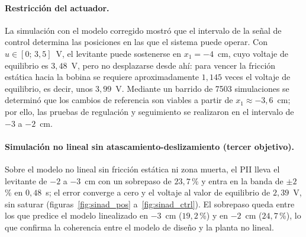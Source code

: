 \paragraph{Restricción del actuador.}
La simulación con el modelo corregido mostró que el intervalo de la señal de control determina las posiciones en las que el sistema puede operar. Con $u\in[0;\,3{,}5]$~V, el levitante puede sostenerse en $x_1=-4$~cm, cuyo voltaje de equilibrio es $3{,}48$~V, pero no desplazarse desde ahí: para vencer la fricción estática hacia la bobina se requiere aproximadamente $1{,}145$ veces el voltaje de equilibrio, es decir, unos $3{,}99$~V. Mediante un barrido de 7503 simulaciones se determinó que los cambios de referencia son viables a partir de $x_1\approx-3{,}6$~cm; por ello, las pruebas de regulación y seguimiento se realizaron en el intervalo de $-3$ a $-2$~cm.

\paragraph{Simulación no lineal sin atascamiento-deslizamiento (tercer objetivo).}
Sobre el modelo no lineal sin fricción estática ni zona muerta, el PII lleva el levitante de $-2$ a $-3$~cm con un sobrepaso de $23{,}7$\,\% y entra en la banda de $\pm2$\,\% en $0{,}48$~s; el error converge a cero y el voltaje al valor de equilibrio de $2{,}39$~V, sin saturar (figuras~\ref{fig:sinad_pos} a~\ref{fig:sinad_ctrl}). El sobrepaso queda entre los que predice el modelo linealizado en $-3$~cm ($19{,}2$\,\%) y en $-2$~cm ($24{,}7$\,\%), lo que confirma la coherencia entre el modelo de diseño y la planta no lineal.

